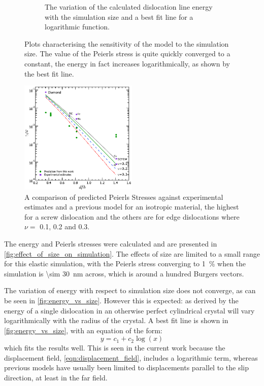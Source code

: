 \begin{figure}
\begin{subfigure}{0.4\textwidth}
\caption{The variation of the calculated dislocation line energy with the simulation size and a best fit line for a logarithmic function.\label{fig:energy_vs_size}}
\end{subfigure}
\caption[The effect of simulation size on dislocation energy and Peierls stress.]{Plots characterising the sensitivity of the model to the simulation size. The value of the Peierls stress is quite quickly converged to a constant, the energy in fact increases logarithmically, as shown by the best fit line.\label{fig:effect_of_size_on_simulation}}
\end{figure}

\begin{figure}
\centering
\includegraphics[width=0.5\textwidth]{tp_G_vs_d_b}
\caption[A comparison of predicted Peierls Stresses against previous estimates.]{A comparison of predicted Peierls Stresses against experimental estimates \cite{Wang1996} and a previous model \cite{Clegg2006} for an isotropic material, the highest for a screw dislocation and the others are for edge dislocations where $\nu=$ 0.1, 0.2 and 0.3. \label{fig:tp_vs_d_b}}
\end{figure}


The energy and Peierls stresses were calculated and are presented in \autoref{fig:effect_of_size_on_simulation}. The effects of size are limited to a small range for this elastic simulation, with the Peierls stress converging to \SI{1}{\percent} when the simulation is  \SI{\sim 30}{\nano\meter} across, which is around a hundred Burgers vectors.

The variation of energy with respect to simulation size does not converge, as can be seen in \autoref{fig:energy_vs_size}. However this is expected: as derived by \citet{Nabarro1947} the energy of a single dislocation in an otherwise perfect cylindrical crystal will vary logarithmically with the radius of the crystal. A best fit line is shown in \autoref{fig:energy_vs_size}, with an equation of the form:
\begin{equation}
y = c_1 + c_2 \log \left( x \right)
\end{equation}
which fits the results well. This is seen in the current work because the displacement field, \autoref{eqn:displacement_field},  includes a logarithmic term, whereas previous models have usually been limited to displacements parallel to the slip direction, at least in the far field.



